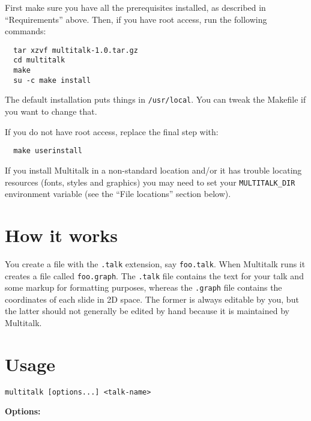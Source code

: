 \documentclass[12pt,a4paper,twoside]{article}
\renewcommand{\_}{\texttt{\symbol{95}}}
\begin{document}
First make sure you have all the prerequisites installed, as
described in ``Requirements'' above. Then, if you have root access,
run the following commands:

\begin{verbatim}
  tar xzvf multitalk-1.0.tar.gz
  cd multitalk
  make
  su -c make install
\end{verbatim}

The default installation puts things in \verb^/usr/local^. You can tweak the
Makefile if you want to change that.

If you do not have root access, replace the final step with:

\begin{verbatim}
  make userinstall
\end{verbatim}

If you install Multitalk in a non-standard location and/or it has
trouble locating resources (fonts, styles and graphics) you may need to
set your \verb^MULTITALK_DIR^ environment variable (see the
``File locations'' section below).

\section{How it works}

You create a file with the \verb=.talk= extension, say \verb=foo.talk=. When
Multitalk runs it creates a file called \verb=foo.graph=. The \verb=.talk= file
contains the text for your talk and some markup for formatting
purposes, whereas the \verb=.graph= file contains the coordinates of each
slide in 2D space. The former is always editable by you, but the latter
should not generally be edited by hand because it is maintained by
Multitalk.

\section{Usage}

\begin{verbatim}
multitalk [options...] <talk-name>
\end{verbatim}

\textbf{Options:}
\end{document}
